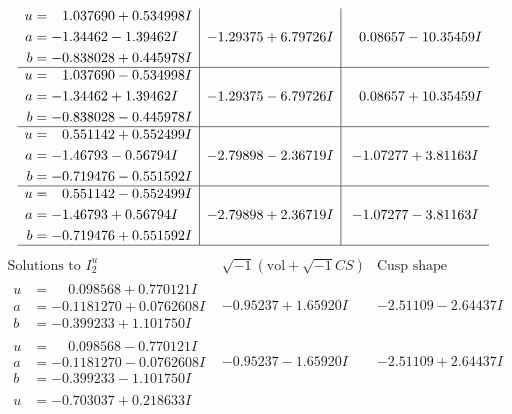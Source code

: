 \documentclass[1p]{elsarticle_modified}
\theoremstyle{definition}
\newcommand{\I}{\sqrt{-1}}
\begin{document}
$$\begin{array}{c|c|c}
\begin{aligned}
u &= \phantom{-}1.037690 + 0.534998 I \\
a &= -1.34462 - 1.39462 I \\
b &= -0.838028 + 0.445978 I\end{aligned}
 & -1.29375 + 6.79726 I & \phantom{-}0.08657 - 10.35459 I \\ \hline\begin{aligned}
u &= \phantom{-}1.037690 - 0.534998 I \\
a &= -1.34462 + 1.39462 I \\
b &= -0.838028 - 0.445978 I\end{aligned}
 & -1.29375 - 6.79726 I & \phantom{-}0.08657 + 10.35459 I \\ \hline\begin{aligned}
u &= \phantom{-}0.551142 + 0.552499 I \\
a &= -1.46793 - 0.56794 I \\
b &= -0.719476 - 0.551592 I\end{aligned}
 & -2.79898 - 2.36719 I & -1.07277 + 3.81163 I \\ \hline\begin{aligned}
u &= \phantom{-}0.551142 - 0.552499 I \\
a &= -1.46793 + 0.56794 I \\
b &= -0.719476 + 0.551592 I\end{aligned}
 & -2.79898 + 2.36719 I & -1.07277 - 3.81163 I\\
 \hline 
 \end{array}$$\newpage$$\begin{array}{c|c|c}  
\text{Solutions to }I^u_{2}& \I (\text{vol} + \sqrt{-1}CS) & \text{Cusp shape}\\
 \hline 
\begin{aligned}
u &= \phantom{-}0.098568 + 0.770121 I \\
a &= -0.1181270 + 0.0762608 I \\
b &= -0.399233 + 1.101750 I\end{aligned}
 & -0.95237 + 1.65920 I & -2.51109 - 2.64437 I \\ \hline\begin{aligned}
u &= \phantom{-}0.098568 - 0.770121 I \\
a &= -0.1181270 - 0.0762608 I \\
b &= -0.399233 - 1.101750 I\end{aligned}
 & -0.95237 - 1.65920 I & -2.51109 + 2.64437 I \\ \hline\begin{aligned}
u &= -0.703037 + 0.218633 I \\

\end{aligned}
\end{array}$$
\end{document}
